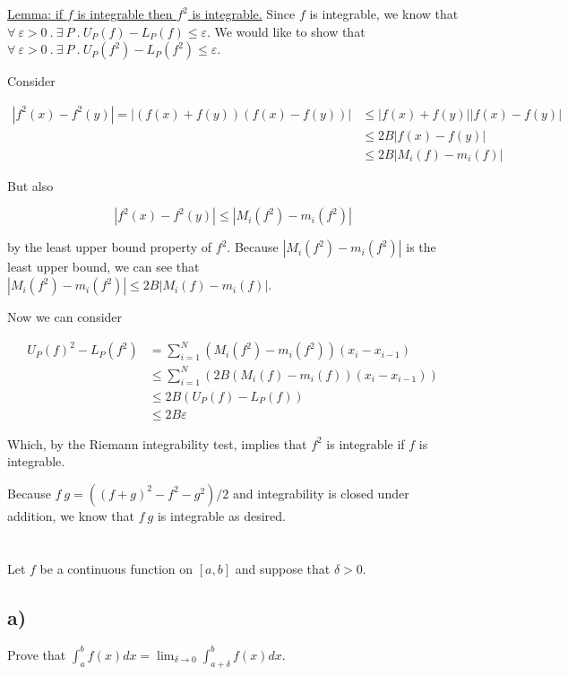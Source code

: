 \documentclass[]{article}
\begin{document}
		\underline{Lemma: if $f$ is integrable then $f^2$ is integrable.} Since $f$ is integrable, we know that $\forall\ \varepsilon > 0\ .\ \exists\ P\ .\ U_P(f) - L_P(f) \leq \varepsilon$. We would like to show that $\forall\ \varepsilon > 0\ .\ \exists\ P\ .\ U_P(f^2) - L_P(f^2) \leq \varepsilon$. 

		Consider 

		\begin{align*}
			|f^2(x) - f^2(y)| = |(f(x) + f(y))(f(x) - f(y))| &\leq |f(x) + f(y)||f(x) - f(y)| \\
			&\leq 2B |f(x) - f(y)| \\
			&\leq 2B |M_i(f) - m_i(f)|
		\end{align*}

		But also

		\[|f^2(x) - f^2(y)| \leq |M_i(f^2) - m_i(f^2)|\]

		by the least upper bound property of $f^2$. Because $|M_i(f^2) - m_i(f^2)|$ is the least upper bound, we can see that $|M_i(f^2) - m_i(f^2)| \leq 2B|M_i(f) - m_i(f)|$. 

		Now we can consider

		\begin{align*}
			U_P(f)^2 - L_P(f^2) &= \sum_{i = 1}^N(M_i(f^2) - m_i(f^2))(x_i - x_{i - 1}) \\
			&\leq \sum_{i = 1}^N(2B(M_i(f) - m_i(f))(x_i - x_{i - 1})) \\
			&\leq 2B (U_P(f) - L_P(f)) \\
			&\leq 2B \varepsilon
		\end{align*}

		Which, by the Riemann integrability test, implies that $f^2$ is integrable if $f$ is integrable. 

		Because $f\ g = ((f + g)^2 - f^2 - g^2)/2$ and integrability is closed under addition, we know that $f\ g$ is integrable as desired.

	\section{}
		\begin{em}
			Let $f$ be a continuous function on $[a, b]$ and suppose that $\delta > 0$. 
		\end{em}

		\subsection*{a)}
			\begin{em}
				Prove that $\int_a^b f(x)dx = \lim_{\delta \to 0} \int_{a + \delta}^b f(x)dx$.
			\end{em}
\end{document}
